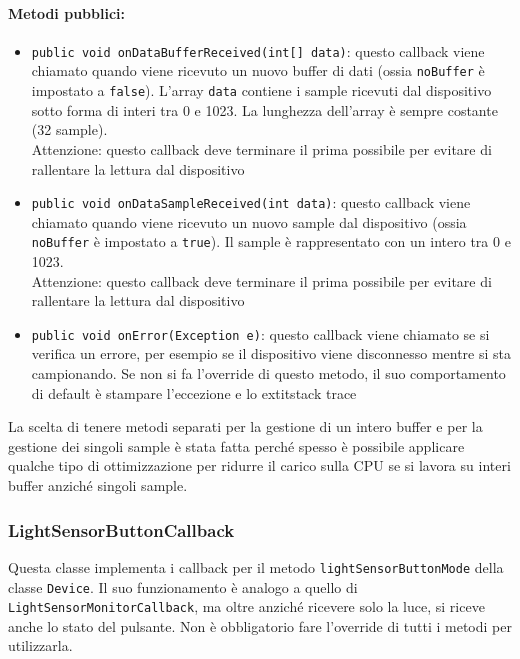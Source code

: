\paragraph{Metodi pubblici:}\begin{itemize}
	\item \texttt{public void onDataBufferReceived(int[] data){}}: questo callback viene chiamato quando viene ricevuto un nuovo buffer di dati (ossia \texttt{noBuffer} è impostato a \texttt{false}). L'array \texttt{data} contiene i sample ricevuti dal dispositivo sotto forma di interi tra 0 e 1023. La lunghezza dell'array è sempre costante (32 sample).\\
	Attenzione: questo callback deve terminare il prima possibile per evitare di rallentare la lettura dal dispositivo
	\item \texttt{public void onDataSampleReceived(int data){}}: questo callback viene chiamato quando viene ricevuto un nuovo sample dal dispositivo (ossia \texttt{noBuffer} è impostato a \texttt{true}). Il sample è rappresentato con un intero tra 0 e 1023.\\
	Attenzione: questo callback deve terminare il prima possibile per evitare di rallentare la lettura dal dispositivo
	\item \texttt{public void onError(Exception e)}: questo callback viene chiamato se si verifica un errore, per esempio se il dispositivo viene disconnesso mentre si sta campionando. Se non si fa l'override di questo metodo, il suo comportamento di default è stampare l'eccezione e lo 	extit{stack trace}
\end{itemize}

La scelta di tenere metodi separati per la gestione di un intero buffer e per la gestione dei singoli sample è stata fatta perché spesso è possibile applicare qualche tipo di ottimizzazione per ridurre il carico sulla CPU se si lavora su interi buffer anziché singoli sample.

\subsubsection{LightSensorButtonCallback}
Questa classe implementa i callback per il metodo \texttt{lightSensorButtonMode} della classe \texttt{Device}. Il suo funzionamento è analogo a quello di \texttt{LightSensorMonitorCallback}, ma oltre anziché ricevere solo la luce, si riceve anche lo stato del pulsante. Non è obbligatorio fare l'override di tutti i metodi per utilizzarla.

